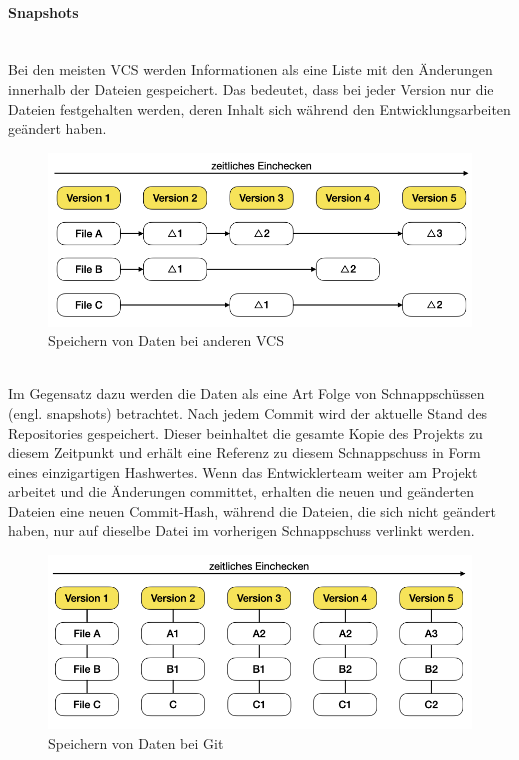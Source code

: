 \paragraph{Snapshots}\mbox{}\\
Bei den meisten VCS werden Informationen als eine Liste mit den Änderungen innerhalb der Dateien gespeichert. Das bedeutet, dass bei jeder Version nur die Dateien festgehalten werden, deren Inhalt sich während den Entwicklungsarbeiten geändert haben.

\begin{figure}[H]
\begin{center}
	\includegraphics[scale=.4]{images/other_vcs.png}
\end{center}
	\caption{Speichern von Daten bei anderen VCS}
\end{figure} 

\mbox{}\\Im Gegensatz dazu werden die Daten als eine Art Folge von Schnappschüssen (engl. snapshots) betrachtet. Nach jedem Commit wird der aktuelle Stand des Repositories gespeichert. Dieser beinhaltet die gesamte Kopie des Projekts zu diesem Zeitpunkt und erhält eine Referenz zu diesem Schnappschuss in Form eines einzigartigen Hashwertes. Wenn das Entwicklerteam weiter am Projekt arbeitet und die Änderungen committet, erhalten die neuen und geänderten Dateien eine neuen Commit-Hash, während die Dateien, die sich nicht geändert haben, nur auf dieselbe Datei im vorherigen Schnappschuss verlinkt werden.

\begin{figure}[H]
\begin{center}
	\includegraphics[scale=.4]{images/git_snapshot.png}
\end{center}
	\caption{Speichern von Daten bei Git}
\end{figure}

